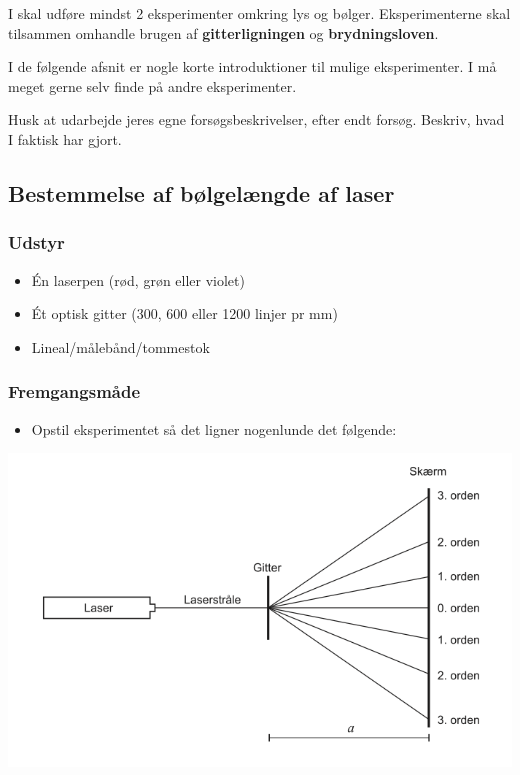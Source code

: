 \documentclass[a4paper, 12pt]{article}
\begin{document}
I skal udføre mindst 2 eksperimenter omkring lys og bølger. Eksperimenterne skal tilsammen omhandle brugen af \textbf{gitterligningen} og \textbf{brydningsloven}.

I de følgende afsnit er nogle korte introduktioner til mulige eksperimenter. I må meget gerne selv finde på andre eksperimenter.

Husk at udarbejde jeres egne forsøgsbeskrivelser, efter endt forsøg. Beskriv, hvad I faktisk har gjort.

\newpage
\subsection*{Bestemmelse af bølgelængde af laser}
\label{sec:org4514271}

\subsubsection*{Udstyr}
\label{sec:org9559c7d}
\begin{itemize}
\item Én laserpen (rød, grøn eller violet)
\item Ét optisk gitter (300, 600 eller 1200 linjer pr mm)
\item Lineal/målebånd/tommestok
\end{itemize}
\subsubsection*{Fremgangsmåde}
\label{sec:orgdb62576}
\begin{itemize}
\item Opstil eksperimentet så det ligner nogenlunde det følgende:
\end{itemize}

\begin{center}
\includegraphics[width=.9\linewidth]{./img/boelgelaengde_laser.png}
\end{center}
\end{document}
